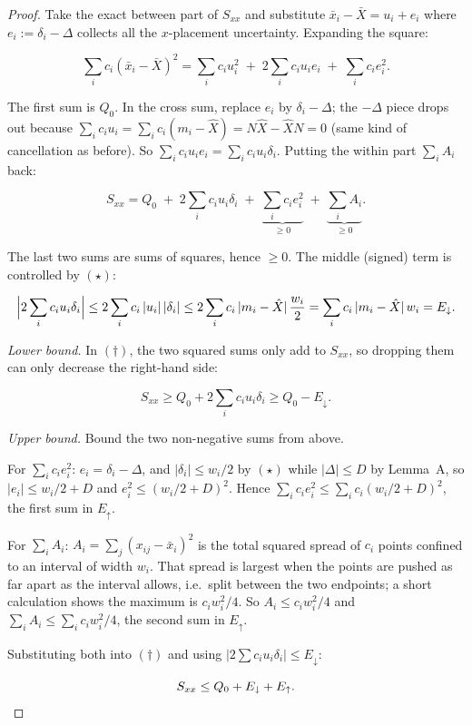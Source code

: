 \documentclass[11pt]{article}
\begin{document}
\begin{proof}
Take the exact between part of $S_{xx}$ and substitute
$\bar x_i-\bar X=u_i+e_i$ where $e_i:=\delta_i-\Delta$ collects all the
$x$-placement uncertainty. Expanding the square:

\[
\sum_i c_i(\bar x_i-\bar X)^2
=\sum_i c_i u_i^2
\;+\;2\sum_i c_i u_i e_i
\;+\;\sum_i c_i e_i^2 .
\]

The first sum is $Q_0$. In the cross sum, replace $e_i$ by
$\delta_i-\Delta$; the $-\Delta$ piece drops out because
$\sum_i c_i u_i=\sum_i c_i(m_i-\hat X)=N\hat X-\hat X N=0$ (same kind of
cancellation as before). So $\sum_i c_i u_i e_i=\sum_i c_i u_i\delta_i$.
Putting the within part $\sum_i A_i$ back:

\[
S_{xx}=Q_0
\;+\;2\sum_i c_i u_i\delta_i
\;+\;\underbrace{\sum_i c_i e_i^2}_{\ge 0}
\;+\;\underbrace{\sum_i A_i}_{\ge 0}.
\tag{$\dagger$}
\]

The last two sums are sums of squares, hence $\ge 0$. The middle
(signed) term is controlled by $(\star)$:

\[
\Bigl|2\sum_i c_i u_i\delta_i\Bigr|
\le 2\sum_i c_i\,|u_i|\,|\delta_i|
\le 2\sum_i c_i\,|m_i-\hat X|\,\frac{w_i}{2}
=\sum_i c_i\,|m_i-\hat X|\,w_i
=E_\downarrow.
\]

\emph{Lower bound.} In $(\dagger)$, the two squared sums only add to
$S_{xx}$, so dropping them can only decrease the right-hand side:

\[
S_{xx}\ge Q_0+2\sum_i c_i u_i\delta_i\ge Q_0-E_\downarrow.
\]

\emph{Upper bound.} Bound the two non-negative sums from above.

For $\sum_i c_i e_i^2$: $e_i=\delta_i-\Delta$, and
$|\delta_i|\le w_i/2$ by $(\star)$ while $|\Delta|\le D$ by Lemma~A, so
$|e_i|\le w_i/2+D$ and $e_i^2\le(w_i/2+D)^2$. Hence
$\sum_i c_i e_i^2\le\sum_i c_i(w_i/2+D)^2$, the first sum in
$E_\uparrow$.

For $\sum_i A_i$: $A_i=\sum_j(x_{ij}-\bar x_i)^2$ is the total squared
spread of $c_i$ points confined to an interval of width $w_i$. That
spread is largest when the points are pushed as far apart as the
interval allows, i.e.\ split between the two endpoints; a short
calculation shows the maximum is $c_i w_i^2/4$. So
$A_i\le c_i w_i^2/4$ and $\sum_i A_i\le\sum_i c_i w_i^2/4$, the second
sum in $E_\uparrow$.

Substituting both into $(\dagger)$ and using
$|2\sum c_i u_i\delta_i|\le E_\downarrow$:

\[
S_{xx}\le Q_0+E_\downarrow+E_\uparrow. \qedhere
\]
\end{proof}
\end{document}
